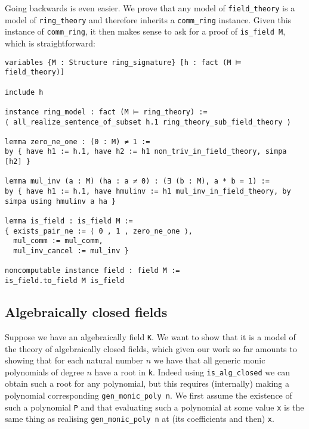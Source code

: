 Going backwards is even easier.
We prove that any model of \texttt{field\_theory}
is a model of \texttt{ring\_theory} and therefore inherits a \texttt{comm\_ring} instance.
Given this instance of \texttt{comm\_ring},
it then makes sense to ask for a proof of \texttt{is\_field M},
which is straightforward:

\begin{lstlisting}
variables {M : Structure ring_signature} [h : fact (M ⊨ field_theory)]

include h

instance ring_model : fact (M ⊨ ring_theory) :=
⟨ all_realize_sentence_of_subset h.1 ring_theory_sub_field_theory ⟩

lemma zero_ne_one : (0 : M) ≠ 1 :=
by { have h1 := h.1, have h2 := h1 non_triv_in_field_theory, simpa [h2] }

lemma mul_inv (a : M) (ha : a ≠ 0) : (∃ (b : M), a * b = 1) :=
by { have h1 := h.1, have hmulinv := h1 mul_inv_in_field_theory, by simpa using hmulinv a ha }

lemma is_field : is_field M :=
{ exists_pair_ne := ⟨ 0 , 1 , zero_ne_one ⟩,
  mul_comm := mul_comm,
  mul_inv_cancel := mul_inv }

noncomputable instance field : field M :=
is_field.to_field M is_field \end{lstlisting}

\subsection{Algebraically closed fields}

Suppose we have an algebraically field \texttt{K}.
We want to show that it is a model of the theory of algebraically closed fields,
which given our work so far amounts to showing that for each natural number $n$
we have that all generic monic polynomials of degree $n$ have a root in \texttt{k}.
Indeed using \texttt{is\_alg\_closed} we can obtain such a root for any polynomial,
but this requires (internally) making a polynomial corresponding \texttt{gen\_monic\_poly n}.
We first assume the existence of such a polynomial \texttt{P}
and that evaluating such a polynomial
at some value \texttt{x} is the same thing as realising \texttt{gen\_monic\_poly n}
at (its coefficients and then) \texttt{x}.

